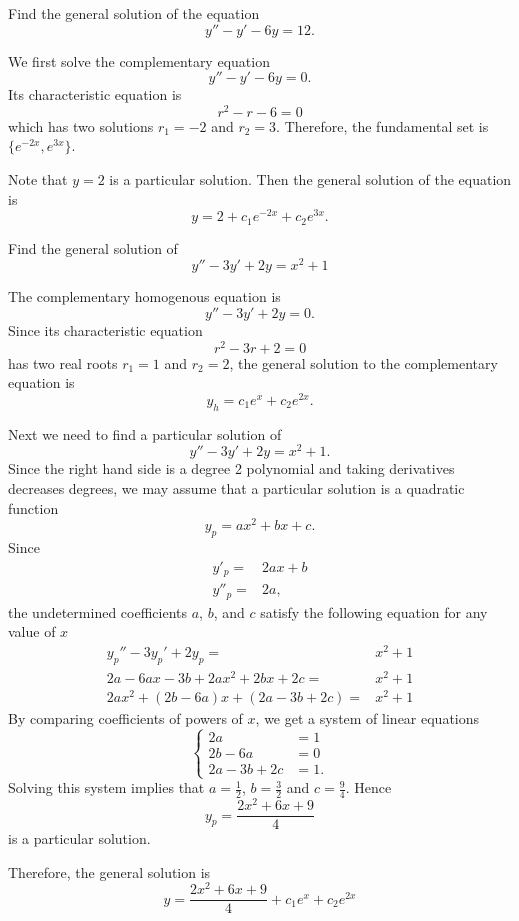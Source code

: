 \begin{example}
  Find the general solution of the equation
  \[y''-y'-6y=12.\]
\end{example}
\begin{solution}
  We first solve the complementary equation
  \[y''-y'-6y=0.\]
  Its characteristic equation is
  \[r^2-r-6=0\]
  which has two solutions $r_1=-2$ and $r_2=3$. Therefore, the fundamental set is $\{e^{-2x}, e^{3x}\}$.

  Note that $y=2$ is a particular solution. Then the general solution of the equation is
  \[y=2+c_1e^{-2x}+c_2e^{3x}.\]
\end{solution}

\begin{example}
  Find the general solution of 
  \[y'' - 3y'  + 2y = x^2 + 1\]
\end{example}
\begin{solution}
  The complementary homogenous equation is
  \[y'' - 3y'  + 2y = 0.\]
  Since its characteristic equation
  \[  r^2 -3r + 2 =0 \]
  has two real roots $r_1=1$ and $r_2=2$, the general solution to the complementary equation is
  \[y_h= c_1e^x + c_2 e^{2x}.\]

  Next we need to find a particular solution of 
  \[y'' - 3y'  + 2y = x^2 + 1.\]
Since the right hand side is a degree 2 polynomial and taking derivatives decreases degrees, we may assume that a particular solution is a quadratic function
  \[y_p= ax^2 + bx + c.\]
 Since
  \[\begin{aligned}
    y'_p =& 2ax + b\\
    y''_p =& 2a,
  \end{aligned}
  \]
 the undetermined coefficients $a$, $b$, and $c$ satisfy the following equation for any value of $x$
\[
  \begin{aligned}
    y_p'' - 3y_p'  + 2y_p =& x^2 + 1\\ 
     2a - 6a x -3b+ 2a x^2 + 2bx + 2c =& x^2 + 1\\
    2a x^2 + (2b -6a)x + (2a - 3b + 2c)  =& x^2 + 1
  \end{aligned}
\]
  By comparing coefficients of powers of $x$, we get a system of linear equations
  \[
    \begin{cases}
      2a  &=  1\\
      2b - 6a &=  0 \\
      2a-3b+ 2c &=1.
    \end{cases}
  \]
  Solving this system implies that $a =\frac{1}{2}$, $b= \frac{3}{2}$ and $c=\frac{9}{4}$. Hence
  \[y_p= \frac{2x^2 + 6x +9}{4}\]
  is a particular solution.
  
  Therefore, the general solution is 
  \[y= \frac{2x^2 + 6x +9}{4} + c_1e^x + c_2 e^{2x}\]
\end{solution}

